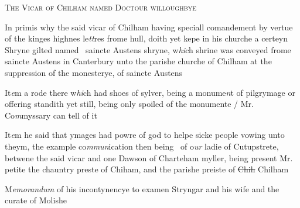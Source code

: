 \documentclass[12pt, a4paper]{book}
\begin{document}
	
				\begin{center} \begin{large} {\scshape The Vicar of Chilham named
 Doctour willoughbye} \end{large} \end{center}
			

	
		
				\marginpar[\vspace{0.5cm}{\textcolor{Gray}{a Shryne}}]{}
			
		
				\marginpar[\vspace{0.5cm}{\textcolor{Gray}{n}}]{}
			
		
		\ifthenelse{\isodd{\thepage}}
		{\reversemarginpar}
		{\normalmarginpar}
		In primis why the said vicar of Chilham having speciall
 comandement by vertue of the kinges highnes le\textit{tt}res frome hull,
 doith yet kepe in his churche a certeyn Shryne gilted named 
 saincte Austens shryne, w\textit{hi}ch shrine was conveyed frome saincte
			Austens in Canterbury unto the parishe churche of Chilham at
 the suppression of the monesterye, of saincte Austens
	
				\marginpar[\vspace{0.5cm}{\textcolor{Gray}{Images}}]{}
			
		\ifthenelse{\isodd{\thepage}}
		{\reversemarginpar}
		{\normalmarginpar}
		It\textit{e}m a rode there w\textit{hi}ch had shoes of sylver, being a monume\textit{n}t
 of pilgrymage or offering standith yet still, being only
 spoiled of the monumente / Mr. Co\textit{m}myssary can tell of it
 
 	
				\marginpar[\vspace{0.5cm}{\textcolor{Gray}{Images}}]{}
			
 	
		\ifthenelse{\isodd{\thepage}}
		{\reversemarginpar}
		{\normalmarginpar}
		It\textit{e}m he said that ymages had powre of god to helpe sicke
 people vowing unto theym, the example co\textit{mmun}ication then being 
 		of o\textit{ur} ladie of Cutupstrete, betwene the said vicar and one
 			Dawson of Charteham myller, being present Mr. petite
 		the chauntry preste of Chiham, and the parishe preiste of
 \sout{Chih} Chilham
 
			
		\ifthenelse{\isodd{\thepage}}
		{\reversemarginpar}
		{\normalmarginpar}
		M\textit{emorandum} of his incontynencye to examen Stryngar and his wife
 	and the curate of Molishe
 	
\end{document}
